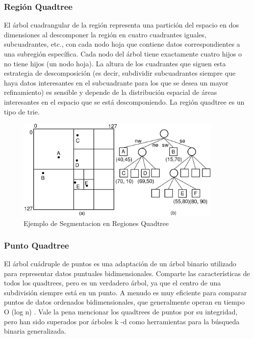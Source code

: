 \documentclass{article}
\begin{document}
\subsubsection{Región Quadtree}

El árbol cuadrangular de la región representa una partición del espacio en dos dimensiones al descomponer la región en cuatro cuadrantes iguales, subcuadrantes, etc., con cada nodo hoja que contiene datos correspondientes a una subregión específica. Cada nodo del árbol tiene exactamente cuatro hijos o no tiene hijos (un nodo hoja). La altura de los cuadrantes que siguen esta estrategia de descomposición (es decir, subdividir subcuadrantes siempre que haya datos interesantes en el subcuadrante para los que se desea un mayor refinamiento) es sensible y depende de la distribución espacial de áreas interesantes en el espacio que se está descomponiendo. La región quadtree es un tipo de trie.

\begin{figure}[H]
\centering
\includegraphics[width=0.9\textwidth]{img/quad1.png}
\caption{Ejemplo de Segmentacion en Regiones Quadtree}
\end{figure}

\subsubsection{Punto Quadtree}

El árbol cuádruple de puntos  es una adaptación de un árbol binario utilizado para representar datos puntuales bidimensionales. Comparte las características de todos los quadtrees, pero es un verdadero árbol, ya que el centro de una subdivisión siempre está en un punto. A menudo es muy eficiente para comparar puntos de datos ordenados bidimensionales, que generalmente operan en tiempo O (log n) . Vale la pena mencionar los quadtrees de puntos por su integridad, pero han sido superados por árboles k -d como herramientas para la búsqueda binaria generalizada.
\end{document}
